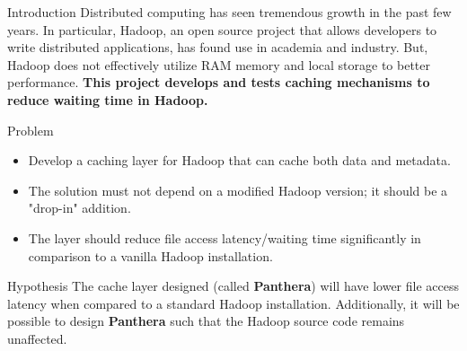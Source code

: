 \documentclass[final]{beamer} %
\begin{document}
  \begin{frame}
    \begin{center}

      \textcolor{black}{
      \textbf{}}
    \end{center}
    
    \begin{columns}[t]
     \begin{column}{0.32\textwidth}
      \begin{block}{Introduction}
      Distributed computing has seen tremendous growth in the past few years.
In particular, Hadoop, an open source project that allows developers to
write distributed applications, has found use in academia and industry.
But, Hadoop does not effectively utilize RAM memory and local storage to
better performance. \textbf{This project develops and tests caching mechanisms
to reduce waiting time in Hadoop.}
      \end{block}
      
    \begin{block}{Problem}
	\begin{itemize}
	 \item Develop a caching layer for Hadoop that can cache both data and metadata.
	 \item The solution must not depend on a modified Hadoop version; it should be a "drop-in" addition.
	 \item The layer should reduce file access latency/waiting time significantly in comparison to a vanilla Hadoop installation.
	\end{itemize}

      \end{block}

      \begin{block}{Hypothesis}
       The cache layer designed (called \textbf{Panthera}) will have lower file
       access latency when compared to a standard Hadoop installation. Additionally, it
       will be possible to design \textbf{Panthera} such that the Hadoop source code
       remains unaffected.
      \end{block}


\end{column}
\end{columns}
\end{frame}
\end{document}
